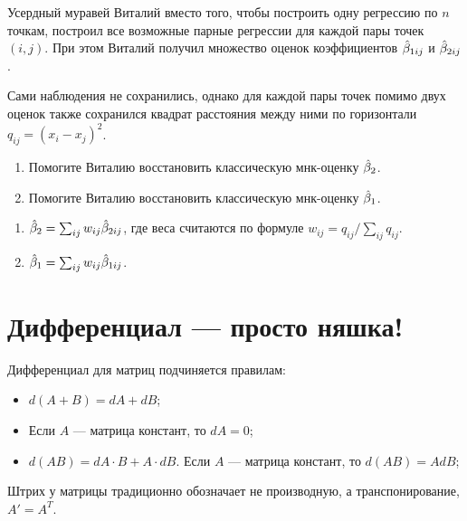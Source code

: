 \begin{problem}
Усердный муравей Виталий вместо того, чтобы построить одну регрессию по $n$ точкам,
построил все возможные парные регрессии для каждой пары точек $(i, j)$.
При этом Виталий получил множество оценок коэффициентов $\hat{\beta}_{1ij}$ и $\hat{\beta}_{2ij}$.

Сами наблюдения не сохранились, однако для каждой пары точек помимо двух оценок также сохранился квадрат расстояния между ними по горизонтали
$q_{ij} = (x_i - x_j)^2$.

\begin{enumerate}
  \item Помогите Виталию восстановить классическую мнк-оценку $\hat{\beta}_2$.
  \item Помогите Виталию восстановить классическую мнк-оценку $\hat{\beta}_1$.
\end{enumerate}
\begin{sol}
  \begin{enumerate}
    \item $\hat{\beta}_2 = \sum_{ij} w_{ij} \hat{\beta}_{2ij}$, где веса считаются по формуле $w_{ij} = q_{ij} / \sum_{ij} q_{ij}$.
    \item $\hat{\beta}_1 = \sum_{ij} w_{ij} \hat{\beta}_{1ij}$.
  \end{enumerate}  
\end{sol}
\end{problem}
  



\section{Дифференциал — просто няшка!}


\begin{leftbar}
Дифференциал для матриц подчиняется правилам:
\begin{itemize}
\item $d(A+B) = dA + dB$;
\item Если $A$ — матрица констант, то $dA = 0$;
\item $d(AB) = dA \cdot B + A \cdot dB$. Если $A$ — матрица констант, то $d(AB) = AdB$;
\end{itemize}

Штрих у матрицы традиционно обозначает не производную, а транспонирование, $A'=A^T$.
\end{leftbar}

